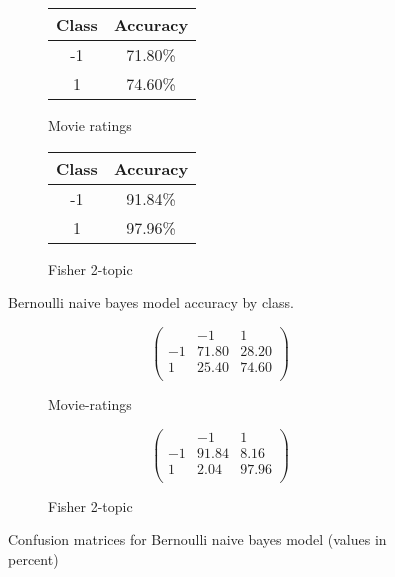 \documentclass[10pt,a4paper]{article}
\begin{document}
\begin{figure}[H]
\centering
\begin{subfigure}{0.3\textwidth}
\begin{tabular}{|c|c|}
\hline
Class & Accuracy \\
\hline
-1 & 71.80\% \\
1 & 74.60\% \\
\hline
\end{tabular}
\caption{Movie ratings}
\end{subfigure}%
\begin{subfigure}{0.3\textwidth}
\begin{tabular}{|c|c|}
\hline
Class & Accuracy \\
\hline
-1 & 91.84\% \\
1 & 97.96\% \\
\hline
\end{tabular}
\caption{Fisher 2-topic}
\end{subfigure}
\caption{Bernoulli naive bayes model accuracy by class.}
\end{figure}

\begin{figure}[H]
\begin{subfigure}{0.5\textwidth}
\[
\left(
\begin{array}{c|cc}
 & -1 & 1 \\
\hline
-1 & 71.80 & 28.20 \\
1 & 25.40 & 74.60 \\
\end{array}
\right)
\]
\caption{Movie-ratings}
\end{subfigure}
\begin{subfigure}{0.5\textwidth}
\[
\left(
\begin{array}{c|cc}
 & -1 & 1 \\
\hline
-1 & 91.84 & 8.16 \\
1 & 2.04 & 97.96 \\
\end{array}
\right)
\]
\caption{Fisher 2-topic}
\end{subfigure}
\caption{Confusion matrices for Bernoulli naive bayes model (values in percent)}
\end{figure}
\end{document}
